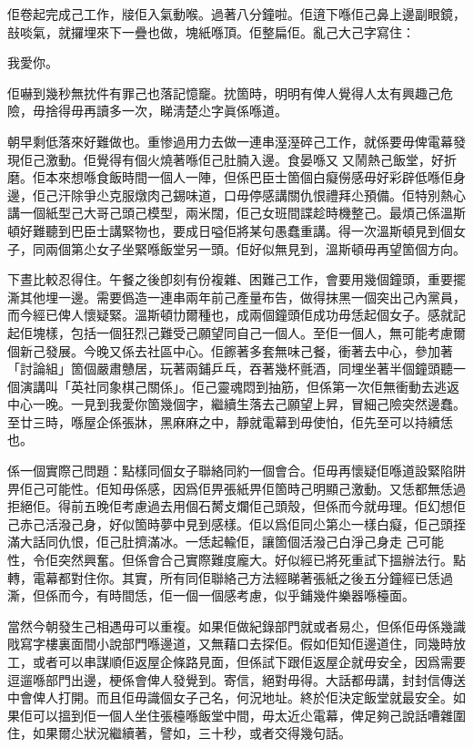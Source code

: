 佢卷起完成己工作，𤗈佢入氣動喉。過著八分鐘啦。佢逳下喺佢己鼻上邊副眼鏡，㪗啖氣，就攞埋來下一疊也做，塊紙喺頂。佢整扁佢。亂己大己字寫住：

我愛你。

佢嚇到幾秒無抌件有罪己也落記憶竉。抌箇時，明明有俾人覺得人太有興趣己危險，毋捨得毋再讀多一次，睇淸楚尐字眞係喺道。

朝早剩低落來好難做也。重惨過用力去做一連串溼溼碎己工作，就係要毋俾電幕發現佢己激動。佢覺得有個火燒著喺佢己肚腩入邊。食晏喺又𤈝又鬧熱己飯堂，好折磨。佢本來想喺食飯時間一個人一陣，但係巴臣士箇個白癡僗感毋好彩辟低喺佢身邊，佢己汗除爭尐克服燉肉己錫味道，口毋停感講關仇恨禮拜尐預備。佢特別熱心講一個紙型己大哥己頭己模型，兩米闊，佢己女班間諜趁時機整己。最煩己係溫斯頓好難聽到巴臣士講緊物也，要成日嗌佢將某句愚蠢重講。得一次溫斯頓見到個女子，同兩個第尐女子坐緊喺飯堂另一頭。佢好似無見到，溫斯頓毋再望箇個方向。

下晝比較忍得住。午餐之後卽刻有份複雜、困難己工作，會要用幾個鐘頭，重要擺澌其他埋一邊。需要僞造一連串兩年前己產量布告，做得抹黑一個突出己內黨員，而今經已俾人懷疑緊。溫斯頓㔹爾種也，成兩個鐘頭佢成功毋恁起個女子。感就記起佢塊樣，包括一個狂烈己難受己願望同自己一個人。至佢一個人，無可能考慮爾個新己發展。今晚又係去社區中心。佢𩟔著多套無味己餐，衝著去中心，參加著「討論組」箇個嚴肅戇居，玩著兩鋪乒乓，吞著幾杯氈酒，同埋坐著半個鐘頭聽一個演講叫「英社同𧰼棋己關係」。佢己靈魂悶到抽筋，但係第一次佢無衝動去逃返中心一晚。一見到我愛你箇幾個字，繼續生落去己願望上昇，冒細己險突然邊蠢。至廿三時，喺屋企係張牀，黑麻麻之中，靜就電幕到毋使怕，佢先至可以持續恁也。

係一個實際己問題：點樣同個女子聯絡同約一個會合。佢毋再懷疑佢喺道設緊陷阱畀佢己可能性。佢知毋係感，因爲佢畀張紙畀佢箇時己明顯己激動。又恁都無恁過拒絕佢。得前五晚佢考慮過去用個石膥攴爛佢己頭殼，但係而今就毋理。佢幻想佢己赤己活潑己身，好似箇時夢中見到感樣。佢以爲佢同尐第尐一樣白癡，佢己頭挃滿大話同仇恨，佢己肚擠滿冰。一恁起輸佢，讓箇個活潑己白淨己身走𠞉己可能性，令佢突然興奮。但係會合己實際難度龐大。好似經已將死重試下搵辦法行。點轉，電幕都對住你。其實，所有同佢聯絡己方法經睇著張紙之後五分鐘經已恁過澌，但係而今，有時間恁，佢一個一個感考慮，似乎鋪幾件樂器喺檯面。

當然今朝發生己相遇毋可以重複。如果佢做紀錄部門就或者易尐，但係佢毋係幾識戙寫字樓裏面間小說部門喺邊道，又無藉口去探佢。假如佢知佢邊道住，同幾時放工，或者可以串謀順佢返屋企條路見面，但係試下跟佢返屋企就毋安全，因爲需要逗遛喺部門出邊，梗係會俾人發覺到。寄信，絕對毋得。大話都毋講，封封信傳送中會俾人打開。而且佢毋識個女子己名，何況地址。終於佢決定飯堂就最安全。如果佢可以搵到佢一個人坐住張檯喺飯堂中間，毋太近尐電幕，俾足夠己說話嘈雜圍住，如果爾尐狀況繼續著，譬如，三十秒，或者交得幾句話。

